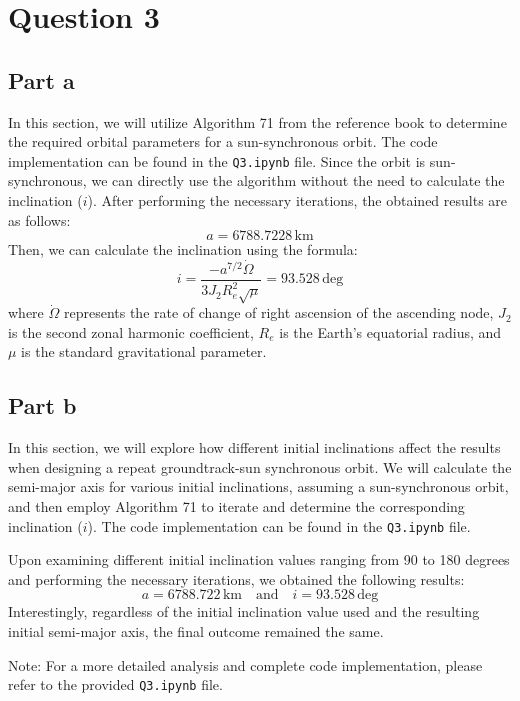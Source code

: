 \section{Question 3}
\subsection{Part a}
In this section, we will utilize Algorithm 71 from the reference book to determine the required orbital parameters for a sun-synchronous orbit. The code implementation can be found in the \texttt{Q3.ipynb} file. Since the orbit is sun-synchronous, we can directly use the algorithm without the need to calculate the inclination ($i$). After performing the necessary iterations, the obtained results are as follows:
$$
a = 6788.7228 \, \text{km}
$$
Then, we can calculate the inclination using the formula:
$$
i = \frac{-a^{7/2}\dot\Omega}{3J_2R_e^2\sqrt{\mu}} = 93.528 \, \text{deg}
$$
where $\dot\Omega$ represents the rate of change of right ascension of the ascending node, $J_2$ is the second zonal harmonic coefficient, $R_e$ is the Earth's equatorial radius, and $\mu$ is the standard gravitational parameter.

\subsection{Part b}
In this section, we will explore how different initial inclinations affect the results when designing a repeat groundtrack-sun synchronous orbit. We will calculate the semi-major axis for various initial inclinations, assuming a sun-synchronous orbit, and then employ Algorithm 71 to iterate and determine the corresponding inclination ($i$). The code implementation can be found in the \texttt{Q3.ipynb} file. 

Upon examining different initial inclination values ranging from 90 to 180 degrees and performing the necessary iterations, we obtained the following results:
$$
a = 6788.722 \, \text{km} \quad \text{and} \quad i = 93.528 \, \text{deg}
$$
Interestingly, regardless of the initial inclination value used and the resulting initial semi-major axis, the final outcome remained the same.

Note: For a more detailed analysis and complete code implementation, please refer to the provided \texttt{Q3.ipynb} file.